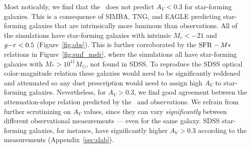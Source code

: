 Most noticably, we find that the \eda~does not predict $A_V < 0.3$ for
star-forming galaxies.
This is a consequence of SIMBA, TNG, and EAGLE predicting star-forming galaxies
that are intrinsically more luminous than observations.  
All of the simulations have star-forming galaxies with intrinsic $M_r <
-21$ and $g{-}r < 0.5$ (Figure~\ref{fig:obs}). 
This is further corroborated by the ${\rm SFR}-M*$ relations in
Figure~\ref{fig:smf_msfr}, where the simulations all have star-forming
galaxies with $M_* > 10^{11}M_\odot$, not found in SDSS. 
To reproduce the SDSS optical color-magnitude relation these galaxies would
need to be significantly reddened and attenuated so any dust prescription would
need to assign high $A_V$ to star-forming galaxies.
Nevertheless, for $A_V > 0.3$, we find good agreement between the 
attenuation-slope relation predicted by the \eda~and observations. 
We refrain from further scrutinizing on $A_V$ values, since they can vary {\em
significantly} between different observational measurements --- even for the
same galaxy. 
SDSS star-forming galaxies, for instance, have significantly higher 
$A_V > 0.3$ according to the \cite{brinchmann2004} measurements
(Appendix~\ref{sec:slab}).



